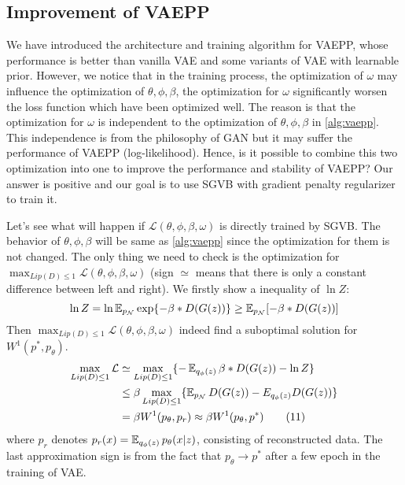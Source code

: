 \subsection{Improvement of VAEPP} \label{subsec:improve_of_vaepp}
We have introduced the architecture and training algorithm for VAEPP, whose performance is better than vanilla VAE and some variants of VAE with learnable prior. However, we notice that in the training process, the optimization of $\omega$ may influence the optimization of $\theta, \phi, \beta$, \EG the optimization for $\omega$ significantly worsen the loss function which have been optimized well. The reason is that the optimization for $\omega$ is independent to the optimization of $\theta, \phi, \beta$ in \cref{alg:vaepp}. This independence is from the philosophy of GAN but it may suffer the performance of VAEPP (log-likelihood). Hence, is it possible to combine this two optimization into one to improve the performance and stability of VAEPP? Our answer is positive and our goal is to use SGVB with gradient penalty regularizer to train it. 

Let's see what will happen if $\mathcal{L}(\theta, \phi, \beta, \omega)$ is directly trained by SGVB. The behavior of $\theta, \phi, \beta$ will be same as \cref{alg:vaepp} since the optimization for them is not changed. The only thing we need to check is the optimization for $\max_{Lip(D) \leq 1} \mathcal{L}(\theta, \phi, \beta, \omega)$ (sign $\simeq$ means that there is only a constant difference between left and right). We firstly show a inequality of $\ln Z$:
\begin{equation*}
	\ln Z = \ln \operatorname{\mathbb{E}}_{p_\mathcal{N}} \exp \{- \beta * D(G(z))\} \geq \operatorname{\mathbb{E}}_{p_\mathcal{N}} [- \beta * D(G(z))]
\end{equation*}
Then $\max_{Lip(D) \leq 1} \mathcal{L}(\theta, \phi, \beta, \omega)$ indeed find a suboptimal solution for $W^1(p^*, p_\theta)$. 
\begin{align*}\label{eq:improve_vaepp}
	\max_{Lip(D) \leq 1} \mathcal{L} &\simeq \max_{Lip(D) \leq 1} \{ -\operatorname{\mathbb{E}}_{q_\phi(z)} \beta*D(G(z)) - \ln Z \}\\ 
	&\leq \beta \max_{Lip(D) \leq 1} \{ \operatorname{\mathbb{E}}_{p_\mathcal{N}} D(G(z)) - E_{q_\phi(z)} D(G(z)) \} \\
	&= \beta W^1(p_\theta, p_r) \approx \beta W^1(p_\theta, p^*) \tag{11}
\end{align*}
where $p_r$ denotes $p_r(x) = \operatorname{\mathbb{E}}_{q_\phi(z)} p_\theta(x|z)$, consisting of reconstructed data. The last approximation sign is from the fact that $p_\theta \rightarrow p^*$ after a few epoch in the training of VAE. 

